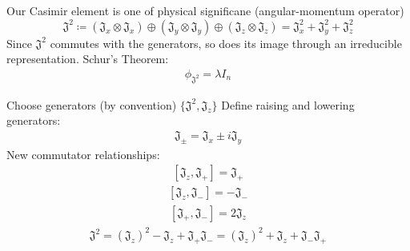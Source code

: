 \documentclass[compress,aspectratio=169,10pt,usenames,dvipsnames]{beamer}
\begin{document}
\begin{frame}
\vfill
Our Casimir element is one of physical significane (angular-momentum operator)
$$\mathfrak{J^2} \coloneq (\mathfrak{J}_x \otimes \mathfrak{J}_x) \oplus (\mathfrak{J}_y \otimes \mathfrak{J}_y) \oplus (\mathfrak{J}_z \otimes \mathfrak{J}_z) = \mathfrak{J}_x^2 + \mathfrak{J}_y^2 + \mathfrak{J}_z^2$$
\vfill
Since $\mathfrak{J^2}$ commutes with the generators, so does its image through an irreducible representation.
\vfill
Schur's Theorem: 
\begin{equation}
	\begin{aligned}\phi_{\mathfrak{J^2}} = \lambda I_n 	\end{aligned}
\end{equation} 
\vfill
\end{frame}
%
%
\begin{frame}
\vfill
Choose generators (by convention) $\{\mathfrak{J^2}, \mathfrak{J}_z\}$
\vfill
Define raising and lowering generators:
\begin{equation}
	\begin{aligned}
		\mathfrak{J}_\pm = \mathfrak{J}_x \pm i\mathfrak{J}_y
	\end{aligned}
\end{equation} 
\vfill
New commutator relationships:
\begin{equation}
	\begin{aligned}
		[\mathfrak{J}_z,\mathfrak{J}_+] = \mathfrak{J}_+
	\end{aligned}
\end{equation} 
\begin{equation}
	\begin{aligned}
		[\mathfrak{J}_z,\mathfrak{J}_-] = -\mathfrak{J}_-
	\end{aligned}
\end{equation} 
\begin{equation}
	\begin{aligned}
		[\mathfrak{J}_+,\mathfrak{J}_-] = 2\mathfrak{J}_z
	\end{aligned}
\end{equation} 
\begin{equation}
	\begin{aligned}
		\mathfrak{J}^2 = (\mathfrak{J}_z)^2  -\mathfrak{J}_z +\mathfrak{J}_+\mathfrak{J}_- = (\mathfrak{J}_z)^2 +\mathfrak{J}_z+ \mathfrak{J}_-\mathfrak{J}_+
	\end{aligned}
\end{equation} 
\end{frame}
\end{document}
